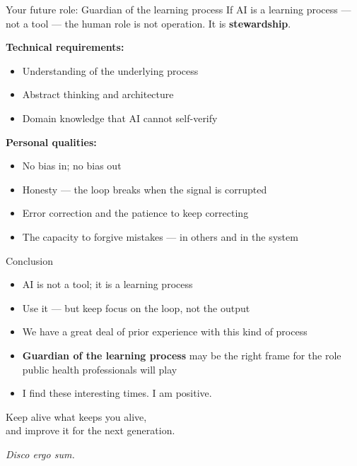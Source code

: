 \documentclass[aspectratio=169]{beamer}
\begin{document}
\begin{frame}{Your future role: Guardian of the learning process}
  If AI is a learning process --- not a tool --- the human role is not
  operation. It is \textbf{stewardship}.

  \vspace{0.5em}
  \textbf{Technical requirements:}
  \begin{itemize}
    \item Understanding of the underlying process
    \item Abstract thinking and architecture
    \item Domain knowledge that AI cannot self-verify
  \end{itemize}

  \vspace{0.5em}
  \textbf{Personal qualities:}
  \begin{itemize}
    \item No bias in; no bias out
    \item Honesty --- the loop breaks when the signal is corrupted
    \item Error correction and the patience to keep correcting
    \item The capacity to forgive mistakes --- in others and in the system
  \end{itemize}
\end{frame}

\begin{frame}{Conclusion}
  \begin{itemize}
    \item AI is not a tool; it is a learning process
    \item Use it --- but keep focus on the loop, not the output
    \item We have a great deal of prior experience with this kind of process
    \item \textbf{Guardian of the learning process} may be the right frame for
          the role public health professionals will play
    \item I find these interesting times. I am positive.
  \end{itemize}
\end{frame}

\begin{frame}[standout]
  Keep alive what keeps you alive,\\
  and improve it for the next generation.

  \vspace{1.5em}
  \textit{Disco ergo sum.}
\end{frame}
\end{document}
